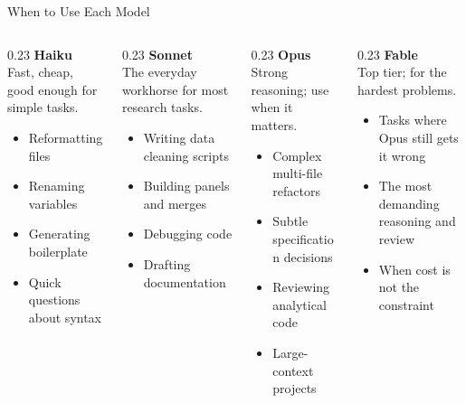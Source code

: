 \documentclass[aspectratio=169, 11pt]{beamer}
\begin{document}
\begin{frame}{When to Use Each Model}
  \begin{columns}[T]
    \begin{column}{0.23\textwidth}
      \textbf{Haiku}\\[0.3em]
      {\small Fast, cheap, good enough for simple tasks.}
      \begin{itemize}
        \item Reformatting files
        \item Renaming variables
        \item Generating boilerplate
        \item Quick questions about syntax
      \end{itemize}
    \end{column}
    \begin{column}{0.23\textwidth}
      \textbf{Sonnet}\\[0.3em]
      {\small The everyday workhorse for most research tasks.}
      \begin{itemize}
        \item Writing data cleaning scripts
        \item Building panels and merges
        \item Debugging code
        \item Drafting documentation
      \end{itemize}
    \end{column}
    \begin{column}{0.23\textwidth}
      \textbf{Opus}\\[0.3em]
      {\small Strong reasoning; use when it matters.}
      \begin{itemize}
        \item Complex multi-file refactors
        \item Subtle specification decisions
        \item Reviewing analytical code
        \item Large-context projects
      \end{itemize}
    \end{column}
    \begin{column}{0.23\textwidth}
      \textbf{Fable}\\[0.3em]
      {\small Top tier; for the hardest problems.}
      \begin{itemize}
        \item Tasks where Opus still gets it wrong
        \item The most demanding reasoning and review
        \item When cost is not the constraint
      \end{itemize}
    \end{column}
  \end{columns}
\end{frame}
\end{document}
